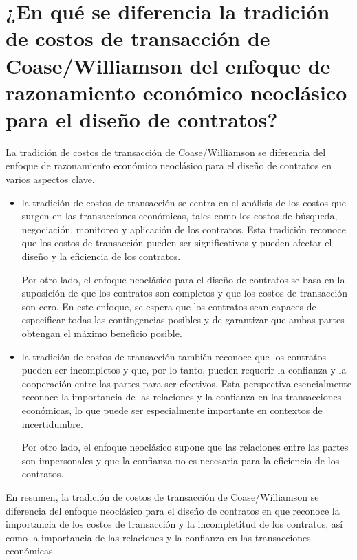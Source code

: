 \documentclass[11pt]{article}
\begin{document}
\section{¿En qué se diferencia la tradición de costos de transacción de Coase/Williamson del enfoque de razonamiento económico neoclásico para el diseño de contratos?}

\begin{flushleft}
    La tradición de costos de transacción de Coase/Williamson se diferencia del enfoque de razonamiento económico neoclásico para el diseño de contratos en varios aspectos clave.

\begin{itemize}
    \item la tradición de costos de transacción se centra en el análisis de los costos que surgen en las transacciones económicas, tales como los costos de búsqueda, negociación, monitoreo y aplicación de los contratos. Esta tradición reconoce que los costos de transacción pueden ser significativos y pueden afectar el diseño y la eficiencia de los contratos.

    Por otro lado, el enfoque neoclásico para el diseño de contratos se basa en la suposición de que los contratos son completos y que los costos de transacción son cero. En este enfoque, se espera que los contratos sean capaces de especificar todas las contingencias posibles y de garantizar que ambas partes obtengan el máximo beneficio posible.
    
     \item la tradición de costos de transacción también reconoce que los contratos pueden ser incompletos y que, por lo tanto, pueden requerir la confianza y la cooperación entre las partes para ser efectivos. Esta perspectiva esencialmente reconoce la importancia de las relaciones y la confianza en las transacciones económicas, lo que puede ser especialmente importante en contextos de incertidumbre.
    
    Por otro lado, el enfoque neoclásico supone que las relaciones entre las partes son impersonales y que la confianza no es necesaria para la eficiencia de los contratos.
    
\end{itemize}
En resumen, la tradición de costos de transacción de Coase/Williamson se diferencia del enfoque neoclásico para el diseño de contratos en que reconoce la importancia de los costos de transacción y la incompletitud de los contratos, así como la importancia de las relaciones y la confianza en las transacciones económicas.
\end{flushleft}
\end{document}
